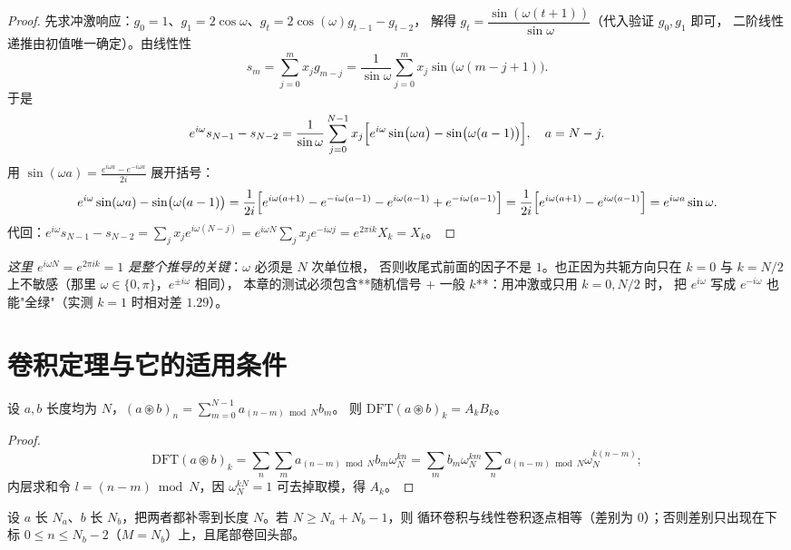 \begin{proof}
先求冲激响应：$g_0=1$、$g_1=2\cos\omega$、$g_t=2\cos(\omega)g_{t-1}-g_{t-2}$，
解得 $g_t=\dfrac{\sin(\omega(t+1))}{\sin\omega}$（代入验证 $g_0,g_1$ 即可，
二阶线性递推由初值唯一确定）。由线性性
\[
s_m=\sum_{j=0}^{m}x_jg_{m-j}=\frac1{\sin\omega}\sum_{j=0}^{m}x_j\sin\bigl(\omega(m-j+1)\bigr).
\]
于是
\[
e^{i\omega}s_{N-1}-s_{N-2}
=\frac1{\sin\omega}\sum_{j=0}^{N-1}x_j\Bigl[e^{i\omega}\sin\bigl(\omega a\bigr)-\sin\bigl(\omega(a-1)\bigr)\Bigr],
\quad a=N-j .
\]
用 $\sin(\omega a)=\frac{e^{i\omega a}-e^{-i\omega a}}{2i}$ 展开括号：
\[
e^{i\omega}\sin(\omega a)-\sin\bigl(\omega(a-1)\bigr)
=\frac1{2i}\Bigl[e^{i\omega(a+1)}-e^{-i\omega(a-1)}-e^{i\omega(a-1)}+e^{-i\omega(a-1)}\Bigr]
=\frac1{2i}\Bigl[e^{i\omega(a+1)}-e^{i\omega(a-1)}\Bigr]
=e^{i\omega a}\sin\omega .
\]
代回：$e^{i\omega}s_{N-1}-s_{N-2}=\sum_j x_j e^{i\omega(N-j)}
=e^{i\omega N}\sum_j x_j e^{-i\omega j}=e^{2\pi ik}X_k=X_k$。
\end{proof}

\emph{这里 $e^{i\omega N}=e^{2\pi ik}=1$ 是整个推导的关键}：$\omega$ 必须是 $N$ 次单位根，
否则收尾式前面的因子不是 $1$。也正因为共轭方向只在
$k=0$ 与 $k=N/2$ 上不敏感（那里 $\omega\in\{0,\pi\}$，$e^{\pm i\omega}$ 相同），
本章的测试必须包含**随机信号 $+$ 一般 $k$**：用冲激或只用 $k=0,N/2$ 时，
把 $e^{i\omega}$ 写成 $e^{-i\omega}$ 也能"全绿"（实测 $k=1$ 时相对差 $1.29$）。

\section{卷积定理与它的适用条件}

\begin{theorem}[循环卷积定理]
\label{thm:circ-conv}
设 $a,b$ 长度均为 $N$，$(a\circledast b)_n=\sum_{m=0}^{N-1}a_{(n-m)\bmod N}b_m$。
则 $\mathrm{DFT}(a\circledast b)_k=A_kB_k$。
\end{theorem}

\begin{proof}
\[
\mathrm{DFT}(a\circledast b)_k=\sum_n\sum_m a_{(n-m)\bmod N}b_m\omega_N^{kn}
=\sum_m b_m\omega_N^{km}\sum_n a_{(n-m)\bmod N}\omega_N^{k(n-m)};
\]
内层求和令 $l=(n-m)\bmod N$，因 $\omega_N^{kN}=1$ 可去掉取模，得 $A_k$。
\end{proof}

\begin{corollary}[什么时候等于线性卷积]
\label{cor:linear-eq-circular}
设 $a$ 长 $N_a$、$b$ 长 $N_b$，把两者都补零到长度 $N$。若 $N\ge N_a+N_b-1$，则
循环卷积与线性卷积逐点相等（差别为 $0$）；否则差别只出现在下标
$0\le n\le N_b-2$（$M=N_b$）上，且尾部卷回头部。
\end{corollary}


